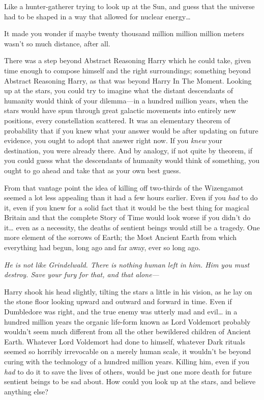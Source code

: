 Like a hunter-gatherer trying to look up at the Sun, and guess that the universe had to be shaped in a way that allowed for nuclear energy{\ldots}

It made you wonder if maybe twenty thousand million million million meters wasn't so much distance, after all.

There was a step beyond Abstract Reasoning Harry which he could take, given time enough to compose himself and the right surroundings; something beyond Abstract Reasoning Harry, as that was beyond Harry In The Moment. Looking up at the stars, you could try to imagine what the distant descendants of humanity would think of your dilemma—in a hundred million years, when the stars would have spun through great galactic movements into entirely new positions, every constellation scattered. It was an elementary theorem of probability that if you knew what your answer would be after updating on future evidence, you ought to adopt that answer right now. If you \emph{knew} your destination, you were already there. And by analogy, if not quite by theorem, if you could guess what the descendants of humanity would think of something, you ought to go ahead and take that as your own best guess.

From that vantage point the idea of killing off two-thirds of the Wizengamot seemed a lot less appealing than it had a few hours earlier. Even if you \emph{had} to do it, even if you knew for a solid fact that it would be the best thing for magical Britain and that the complete Story of Time would look worse if you didn't do it{\ldots} even as a necessity, the deaths of sentient beings would still be a tragedy. One more element of the sorrows of Earth; the Most Ancient Earth from which everything had begun, long ago and far away, ever so long ago.

\emph{He is not like Grindelwald. There is nothing human left in him. Him you must destroy. Save your fury for that, and that alone—}

Harry shook his head slightly, tilting the stars a little in his vision, as he lay on the stone floor looking upward and outward and forward in time. Even if Dumbledore was right, and the true enemy was utterly mad and evil{\ldots} in a hundred million years the organic life-form known as Lord Voldemort probably wouldn't seem much different from all the other bewildered children of Ancient Earth. Whatever Lord Voldemort had done to himself, whatever Dark rituals seemed so horribly irrevocable on a merely human scale, it wouldn't be beyond curing with the technology of a hundred million years. Killing him, even if you \emph{had} to do it to save the lives of others, would be just one more death for future sentient beings to be sad about. How could you look up at the stars, and believe anything else?

